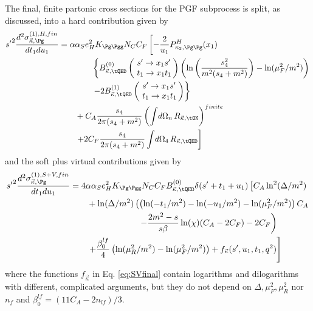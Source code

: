 The final, finite partonic cross sections for the PGF subprocess is split, as discussed, into a hard contribution given by
\begin{align}
{s'}^2\frac{d^2\sigma_{\vec \kappa,\Pg}^{(1),H,fin}}{dt_1du_1} &=\alpha\alpha_Se_H^2K_{\Pg\Pgg}N_CC_F\left[-\frac 2 {u_1}P^H_{\kappa_2,\Pg\Pg}(x_1)\right. \nonumber\\
 &\hspace{40pt}\left\{ B^{(0)}_{\vec \kappa,\tQED}\left(\!\begin{array}{l}s'\rightarrow x_1s'\\t_1\rightarrow x_1 t_1\end{array}\!\!\right) \left(\ln\left(\frac{s_4^2}{m^2(s_4+m^2)}\right)-\ln(\mu_F^2/m^2)\right)\right. \nonumber\\
 &\hspace{40pt}\left.-2B^{(1)}_{\vec \kappa,\tQED}\left(\!\begin{array}{l}s'\rightarrow x_1s'\\t_1\rightarrow x_1 t_1\end{array}\!\!\right)\right\} \nonumber\\
 &\hspace{20pt}+C_A\frac{s_4}{2\pi(s_4+m^2)}\left(\int\!d\Omega_n\,R_{\vec \kappa,\tOK}\right)^{finite} \nonumber\\
 &\hspace{20pt}\left.+2C_F\frac{s_4}{2\pi(s_4+m^2)}\int\!d\Omega_4\,R_{\vec \kappa,\tQED}\right] \label{eq:Hfinal}
\end{align}
and the soft plus virtual contributions given by
\begin{align}
{s'}^2\frac{d^2\sigma_{\vec \kappa,\Pg}^{(1),S+V,fin}}{dt_1du_1} &=4\alpha\alpha_Se_H^2K_{\Pg\Pgg}N_CC_FB^{(0)}_{\vec \kappa,\tQED}\delta(s'+t_1+u_1)\left[C_A\ln^2(\Delta/m^2) \right.\nonumber\\
 &\hspace{20pt} + \ln(\Delta/m^2)\left(\left(\ln(-t_1/m^2)-\ln(-u_1/m^2)-\ln(\mu_F^2/m^2)\right)C_A \right. \nonumber\\
 &\hspace{80pt} \left. - \frac{2m^2-s}{s\beta}\ln(\chi)(C_A-2C_F) - 2C_F\right) \nonumber\\
 &\hspace{20pt}\left. + \frac {\beta_0^{lf}}{4}\left(\ln(\mu_R^2/m^2)- \ln(\mu_F^2/m^2)\right) +  f_{\vec \kappa}(s',u_1,t_1,q^2)\right] \label{eq:SVfinal}
\end{align}
where the functions $f_{\vec \kappa}$ in Eq. \ref{eq:SVfinal} contain logarithms and dilogarithms with different, complicated arguments, but they do not depend on $\Delta,\mu_F^2,\mu_R^2$ nor $n_f$ and $\beta_0^{lf} = (11C_A - 2n_{lf})/3$.

